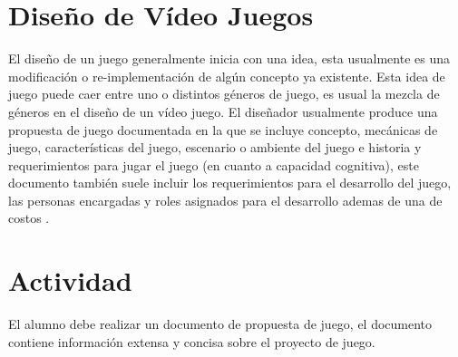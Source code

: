 \section{Diseño de Vídeo Juegos}
El diseño de un juego generalmente inicia con una idea, esta usualmente es una modificación o re-implementación de algún concepto ya existente. Esta idea de juego puede caer entre uno o distintos géneros de juego, es usual la mezcla de géneros en el diseño de un vídeo juego. El diseñador usualmente produce una propuesta de juego documentada en la que se incluye concepto, mecánicas de juego, características del juego, escenario o ambiente del juego e historia y requerimientos para jugar el juego (en cuanto a capacidad cognitiva), este documento también suele incluir los requerimientos para el desarrollo del juego, las personas encargadas y roles asignados para el desarrollo ademas de una  de costos \cite[p.~101]{erikgamedevelopment}. 

\section{Actividad}
El alumno debe realizar un documento de propuesta de juego, el documento contiene información extensa y concisa sobre el proyecto de juego.

